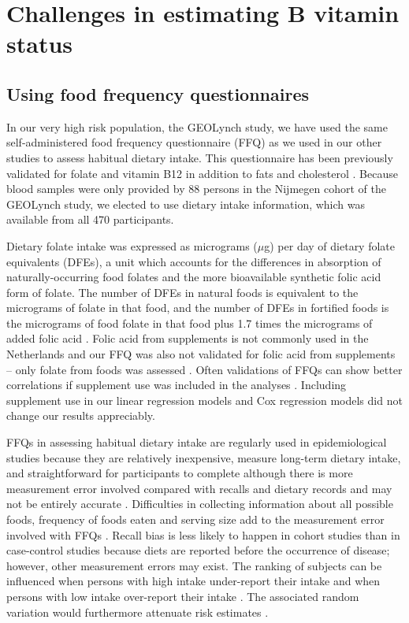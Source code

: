 \section[]{Challenges in estimating B vitamin status} %
\subsection{Using food frequency questionnaires} %
\noindent In our very high risk population, the GEOLynch study, we have used the same self-administered food frequency questionnaire (FFQ) as we used in our other studies to assess habitual dietary intake. This questionnaire has been previously validated for folate and vitamin B12 \cite{c717} in addition to fats and cholesterol \cite{c718}. Because blood samples were only provided by 88 persons in the Nijmegen cohort of the GEOLynch study, we elected to use dietary intake information, which was available from all 470 participants. 
 
\noindent Dietary folate intake was expressed as micrograms ($\mu$g) per day of dietary folate equivalents (DFEs), a unit which accounts for the differences in absorption of naturally-occurring food folates and the more bioavailable synthetic folic acid form of folate. The number of DFEs in natural foods is equivalent to the micrograms of folate in that food, and the number of DFEs in fortified foods is the micrograms of food folate in that food plus 1.7 times the micrograms of added folic acid \cite{c719}. Folic acid from supplements is not commonly used in the Netherlands \cite{c720} and our FFQ was also not validated for folic acid from supplements -- only folate from foods was assessed \cite{c717}. Often validations of FFQs can show better correlations if supplement use was included in the analyses \cite{c721,c722,c723}. Including supplement use in our linear regression models and Cox regression models did not change our results appreciably. 
 
\noindent FFQs in assessing habitual dietary intake are regularly used in epidemiological studies because they are relatively inexpensive, measure long-term dietary intake, and straightforward for participants to complete \cite{c724} although there is more measurement error involved compared with recalls and dietary records and may not be entirely accurate \cite{c725,c726}. Difficulties in collecting information about all possible foods, frequency of foods eaten and serving size add to the measurement error involved with FFQs \cite{c727}. Recall bias is less likely to happen in cohort studies than in case-control studies because diets are reported before the occurrence of disease; however, other measurement errors may exist. The ranking of subjects can be influenced when persons with high intake under-report their intake and when persons with low intake over-report their intake \cite{c728}. The associated random variation would furthermore attenuate risk estimates \cite{c729}. 
 
